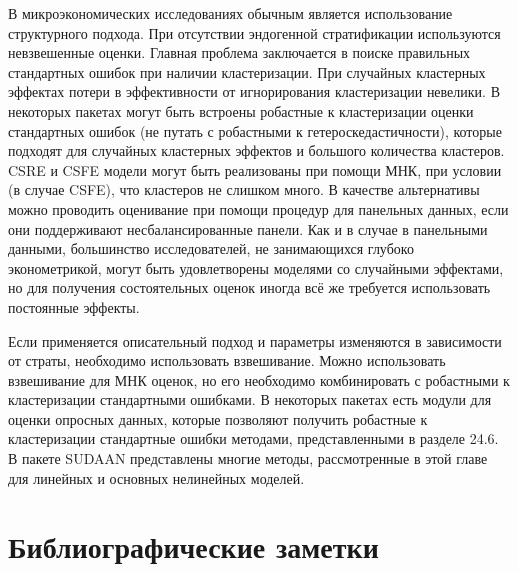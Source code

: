 В микроэкономических исследованиях обычным является использование структурного подхода. При отсутствии эндогенной стратификации используются невзвешенные оценки. Главная проблема заключается в поиске правильных стандартных ошибок при наличии кластеризации. При случайных кластерных эффектах потери в эффективности от игнорирования кластеризации невелики. В некоторых пакетах могут быть встроены робастные к кластеризации оценки стандартных ошибок (не путать с робастными к гетероскедастичности), которые подходят для случайных кластерных эффектов и большого количества кластеров. CSRE и CSFE модели могут быть реализованы при помощи МНК, при условии (в случае CSFE), что кластеров не слишком много. В качестве альтернативы можно проводить оценивание при помощи процедур для панельных данных, если они поддерживают несбалансированные панели. Как и в случае в панельными данными, большинство исследователей, не занимающихся глубоко эконометрикой, могут быть удовлетворены моделями со случайными эффектами, но для получения состоятельных оценок иногда всё же требуется использовать постоянные эффекты. 

Если применяется описательный подход и параметры изменяются в зависимости от страты, необходимо использовать взвешивание. Можно использовать взвешивание для МНК оценок, но его необходимо комбинировать с робастными к кластеризации стандартными ошибками. В некоторых пакетах есть модули для оценки опросных данных, которые позволяют получить робастные к кластеризации стандартные ошибки методами, представленными в разделе 24.6. В пакете SUDAAN представлены многие методы, рассмотренные в этой главе для линейных и основных нелинейных моделей. 

\section{Библиографические заметки}

